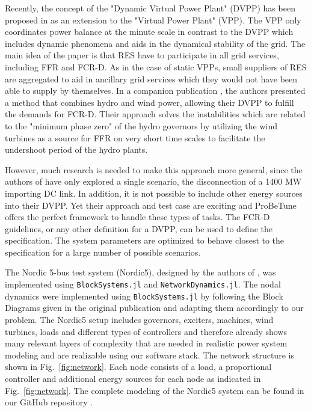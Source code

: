 \documentclass[conference]{IEEEtran}
\begin{document}
Recently, the concept of the "Dynamic Virtual Power Plant" (DVPP) has been proposed in \cite{dvpp} as an extension to the "Virtual Power Plant" (VPP). The VPP only coordinates power balance at the minute scale in contrast to the DVPP which includes dynamic phenomena and aids in the dynamical stability of the grid. The main idea of the paper is that RES have to participate in all grid services, including FFR and FCR-D. As in the case of static VPPs, small suppliers of RES are aggregated to aid in ancillary grid services which they would not have been able to supply by themselves. In a companion publication \cite{hydro_and_wind}, the authors presented a method that combines hydro and wind power, allowing their DVPP to fulfill the demands for FCR-D. Their approach solves the instabilities which are related to the "minimum phase zero" of the hydro governors by utilizing the wind turbines as a source for FFR on very short time scales to facilitate the undershoot period of the hydro plants.

However, much research is needed to make this approach more general, since the authors of \cite{hydro_and_wind} have only explored a single scenario, the disconnection of a 1400 MW importing DC link. In addition, it is not possible to include other energy sources into their DVPP. Yet their approach and test case are exciting and ProBeTune offers the perfect framework to handle these types of tasks. The FCR-D guidelines, or any other definition for a DVPP, can be used to define the specification. The system parameters are optimized to behave closest to the specification for a large number of possible scenarios.

The Nordic 5-bus test system (Nordic5), designed by the authors of \cite{hydro_and_wind}, was implemented using \texttt{BlockSystems.jl} and \texttt{NetworkDynamics.jl}. The nodal dynamics were implemented using \texttt{BlockSystems.jl} by following the Block Diagrams given in the original publication \cite{hydro_and_wind} and adapting them accordingly to our problem.
The Nordic5 setup includes governors, exciters, machines, wind turbines, loads and different types of controllers and therefore already shows many relevant layers of complexity that are needed in realistic power system modeling and are realizable using our software stack. The network structure is shown in Fig.~\ref{fig:network}. Each node consists of a load, a proportional controller and additional energy sources for each node as indicated in Fig.~\ref{fig:network}. The complete modeling of the Nordic5 system can be found in our GitHub repository \cite{github_repo}.
\end{document}
